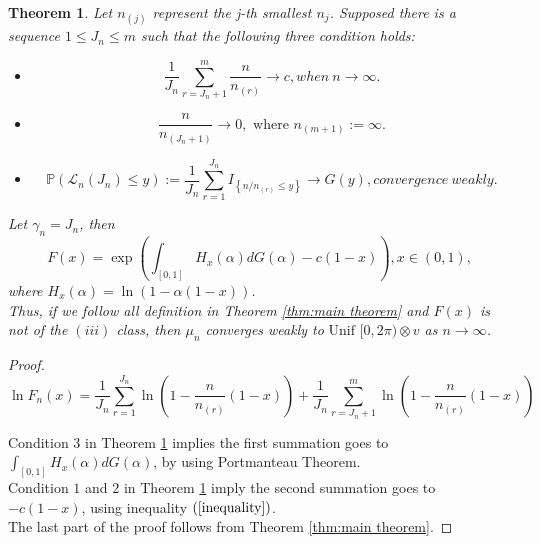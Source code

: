 \documentclass[12pt]{article}
\theoremstyle{plain}
\newtheorem{thm}{\textbf{Theorem}}
\theoremstyle{definition}
\theoremstyle{remark}
\begin{document}
\begin{thm}\label{thm:main theorem 2 with L}
	 Let $n_{(j)}$ represent the j-th smallest $n_j$. Supposed there is a sequence $1\leq J_n \leq m$ such that the following three condition holds:\\
	\begin{itemize}
		\item [1.]	\begin{equation*}
		\frac{1}{J_n}\sum_{r=J_n+1}^{m}\dfrac{n}{n_{(r)}}\rightarrow c, when\ n\rightarrow \infty.
		\end{equation*}
		\item [2.]\begin{equation*}
		\dfrac{n}{n_{(J_n+1)}}\rightarrow 0,\text{ where } n_{(m+1)}:=\infty.
		\end{equation*}
		
		\item [3.]	\begin{equation*}
		\mathbb{P}\left(\mathscr{L}_{n}(J_n) \leqslant y\right):=\frac{1}{J_{n}} \sum_{r=1}^{J_{n}} I_{\left\{n / n_{(r)} \leqslant y\right\}} \rightarrow G(y), convergence\ weakly.
		\end{equation*}
	\end{itemize}
	
	Let $\gamma_{n}=J_n$, then
	\begin{equation}
	F(x)=\exp(\int_{[0,1]} H_{x}(\alpha) d G(\alpha)-c(1-x)), x \in(0,1),
	\end{equation}
	where $H_{x}(\alpha)=\ln (1-\alpha(1-x))$.\\
	Thus, if we follow all definition in Theorem \ref{thm:main theorem} and $F(x)$ is not of the $(iii)$ class, then  $\mu_{n}$ converges weakly to$\text { Unif }[0,2 \pi) \otimes v$ as $n\to \infty$.\\

	
\end{thm}
\begin{proof}
	\begin{equation*}
	\ln F_n(x)=\frac{1}{J_{n}} \sum_{r=1}^{J_{n}} \ln \left(1-\frac{n}{n_{(r)}}(1-x)\right)
	+\frac{1}{J_{n}} \sum_{r=J_n+1}^{m} \ln \left(1-\frac{n}{n_{(r)}}(1-x)\right)
	\end{equation*}
	
	Condition $3$ in Theorem \ref{thm:main theorem 2 with L} implies the first summation goes to \\
	$\int_{[0,1]} H_{x}(\alpha) d G(\alpha)$, by using Portmanteau Theorem.\\
	
	Condition $1$ and $2$ in Theorem \ref{thm:main theorem 2 with L} imply the second summation goes to $-c(1-x)$, using inequality $(\ref{inequality})$.\\
	
	The last part of the proof follows from Theorem \ref{thm:main theorem}.
\end{proof}
\end{document}
